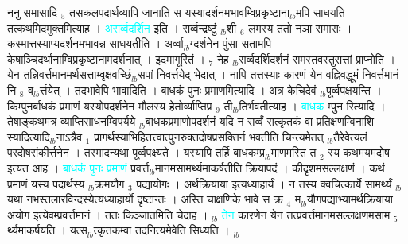 \documentclass[article,12pt,a4paper]{memoir}%
\newcommand{\quotelemma}[1]{\textcolor{cyan}{#1}}
\newcounter{parCount}
\begin{document}
	  
	  \pstart \leavevmode%
	ननु समासादि {\tiny $_{5}$} तसकलपदार्थव्यापि जानाति स यस्यादर्शनमभावम्विप्रकृष्टाना{\tiny $_{lb}$}मपि साधयति तत्कथमिदमुक्तमित्याह । \quotelemma{असर्व्वदर्शिन} \cite[1b7]{vn-msN} इति । सर्व्वन्द्रष्टुं {\tiny $_{lb}$}शी {\tiny $_{6}$} लमस्य ततो नञा समासः । कस्मात्तस्याप्यदर्शनमभावन्न साधयतीति । अर्व्वा{\tiny $_{lb}$}ग्दर्शनेन पुंसा सतामपि केषाञ्चिदर्थानाम्विप्रकृष्टानामदर्शनात् । इदमागूरितं । {\tiny $_{7}$} नेह {\tiny $_{lb}$}सर्व्वदर्शिदर्शनं समस्तवस्तुसत्तां प्राप्नोति । येन तन्निवर्त्तमानमर्थसत्ताम्वृक्षवच्छिं{\tiny $_{lb}$}सपां निवर्त्तयेद् भेदात् । नापि तत्तस्याः कारणं येन वह्निवद्धूमं निवर्त्तमानं नि {\tiny $_{8}$} व{\tiny $_{lb}$}र्त्तयेत् । तदभावेपि भावादिति । बाधकं पुनः प्रमाणमित्यादि । अत्र केचिदेवं {\tiny $_{lb}$}पूर्व्वपक्षयन्ति । किम्पुनर्बाधकं प्रमाणं यस्योपदर्शनेन मौलस्य हेतोर्व्याप्तिप्र {\tiny $_{9}$} \leavevmode{} ती{\tiny $_{lb}$}तिर्भवतीत्याह । \quotelemma{बाधक} म्पुन \cite[1b7]{vn-msN} रित्यादि । तेषाङ्कथमत्र व्याप्तिसाधनम्विपर्यये {\tiny $_{lb}$}बाधकप्रमाणोपदर्शनं यदि न सर्व्वं सत्कृतकं वा प्रतिक्षणम्विनाशि स्यादित्यादि{\tiny $_{lb}$}नाऽत्रैव {\tiny $_{1}$} प्रागर्थस्याभिहितत्त्वात्पुनरुक्तदोषप्रसक्तिर्न भवतीति चिन्त्यमेतत् {\tiny $_{lb}$}तैरेवेत्यलं परदोषसंकीर्त्तनेन । तस्मादन्यथा पूर्व्वपक्ष्यते । यस्यापि तर्हि बाधकम्प्र{\tiny $_{lb}$}माणमस्ति त {\tiny $_{2}$} स्य कथमयमदोष इत्यत आह । \quotelemma{बाधकं पुनः प्रमाणं} \cite[1b7]{vn-msN} प्रवर्त्त{\tiny $_{lb}$}मानमसामर्थ्यमाकर्षतीति क्रियापदं । कीदृशमसल्लक्षणं । कथं प्रमाणं यस्य पदार्थस्य {\tiny $_{lb}$}क्रमयौग {\tiny $_{3}$} पद्यायोगः । अर्थक्रियाया इत्यध्याहार्यं । न तस्य क्वचित्कार्ये सामर्थ्यं {\tiny $_{lb}$}यथा नभस्तलारविन्दस्येत्यध्याहार्यो दृष्टान्तः । अस्ति चाक्षणिके भावे स क्र {\tiny $_{4}$} म{\tiny $_{lb}$}यौगपद्याभ्यामर्थक्रियाया अयोग इत्येवम्प्रवर्त्तमानं । ततः किञ्जातमिति चेदाह । {\tiny $_{lb}$} \quotelemma{तेन} \cite[1b8]{vn-msN} कारणेन येन तत्प्रवर्त्तमानमसल्लक्षणमसाम {\tiny $_{5}$} र्थ्यमाकर्षयति । यत्स{\tiny $_{lb}$}त्कृतकम्वा तदनित्यमेवेति सिध्यति ।
	{}
	\pend%
      {\tiny $_{lb}$}
\end{document}
